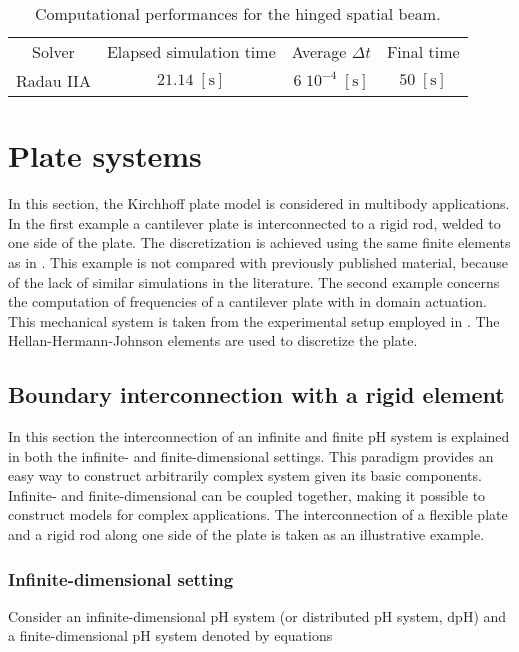 \begin{table}[tb]
	\centering
	\caption{Computational performances for the hinged spatial beam.}
	\label{tab:comp_perf_hinged}       %
	\begin{tabular}{cccc}
		\hline\noalign{\smallskip}
		Solver & Elapsed simulation time & Average $\Delta t$ &  Final time \\
		\noalign{\smallskip}\hline\noalign{\smallskip}
		Radau IIA & $21.14\; \mathrm{[s]}$ & $6 \; 10^{-4} \; \mathrm{[s]}$ & $50 \; \mathrm{[s]}$ \\
		\hline
	\end{tabular}
\end{table}


\section{Plate systems}
In this section, the Kirchhoff plate model is considered in multibody applications. In the first example a cantilever plate is interconnected to a rigid rod, welded to one side of the plate. The discretization is achieved using the same finite elements as in . This example is not compared with previously published material, because of the lack of similar simulations in the literature. The second example concerns the computation of frequencies of a cantilever plate with in domain actuation. This mechanical system is taken from the experimental setup employed in \cite{preda2020}. The Hellan-Hermann-Johnson elements are used to discretize the plate.

\subsection{Boundary interconnection with a rigid element}
In this section the interconnection of an infinite and finite pH system is explained in both the infinite- and finite-dimensional settings. This paradigm provides an easy way to construct arbitrarily complex system given its basic components. Infinite- and finite-dimensional can be coupled together, making it possible to construct models for complex applications. The interconnection of a flexible plate and a rigid rod along one side of the plate is taken as an illustrative example.

\subsubsection{Infinite-dimensional setting}
Consider an infinite-dimensional pH system (or distributed pH system, dpH) and a finite-dimensional pH system denoted by equations 

